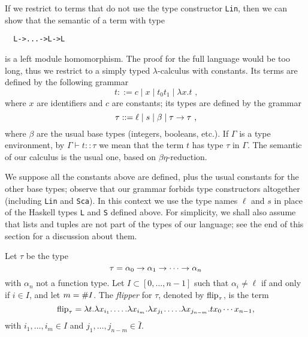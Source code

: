 If we restrict to terms that do not use the type constructor
\lstinline{Lin}, then we can show that the semantic of a term with
type
\begin{lstlisting}
  L->...->L->L
\end{lstlisting}
is a left module homomorphism.    The proof
for the full language would be too long, thus we restrict to a simply
typed $\lambda$-calculus with constants. Its terms are defined by the
following grammar
\begin{equation}
  \label{eq:lambda}
  t ::= c \;|\; x \;|\; t_0 t_1 \;|\; \lambda x . t  \text{ ,}
\end{equation}
where $x$ are identifiers and $c$ are constants; its types are
defined by the grammar
\begin{equation}
  \label{eq:77}
  \tau ::= \ell \;|\; s \;|\; \beta \;|\; \tau \rightarrow \tau
  \text{ ,}
\end{equation}
where $\beta$ are the usual base types (integers, booleans, etc.). If
$\Gamma$ is a type environment, by $\Gamma\vdash t::\tau$ we mean that
the term $t$ has type $\tau$ in $\Gamma$.  The semantic of our
calculus is the usual one, based on $\beta\eta$-reduction.

  We
suppose all the constants above are defined, plus the usual constants
for the other base types; observe that our grammar forbids type
constructors altogether (including \lstinline{Lin} and
\lstinline{Sca}). In this context we use the type names $\ell$ and $s$
in place of the Haskell types \lstinline{L} and \lstinline{S} defined
above. For simplicity, we shall also assume that lists and tuples are
not part of the types of our language; see the end of this section for
a discussion about them.

\begin{definition}[Flipper]
    Let $\tau$ be the type
  \begin{equation}
    \label{eq:58}
    \tau = \alpha_0\rightarrow\alpha_1\rightarrow\cdots\rightarrow\alpha_n
  \end{equation}
  with $\alpha_n$ not a function type. Let $I\subset[0,\ldots,n-1]$
  such that $\alpha_i\ne\ell$ if and only if $i\in I$, and let
  $m=\# I$.  The \emph{flipper} for $\tau$, denoted by $\operatorname{flip}_\tau$,
  is the term
  \begin{equation}
    \label{eq:60}
    \operatorname{flip}_\tau = \lambda t.\lambda x_{i_1}.\ldots.\lambda x_{i_m}.
    \lambda x_{j_1}.\ldots.\lambda x_{j_{n-m}}.tx_0\cdots x_{n-1}
    \text{,}
  \end{equation}
  with $i_1,\ldots,i_m\in I$ and $j_1,\ldots,j_{n-m}\in\bar{I}$.
\end{definition}

